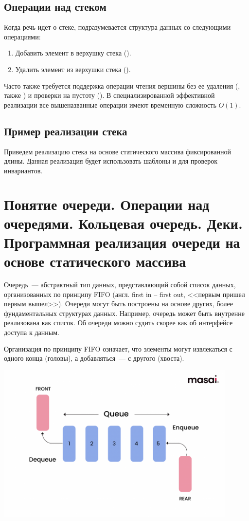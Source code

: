 \subsection{Операции над стеком}
Когда речь идет о стеке, подразумевается структура данных со следующими операциями:
\begin{enumerate}
  \item Добавить элемент в верхушку стека ().
  \item Удалить элемент из верхушки стека ().
\end{enumerate}

Часто также требуется поддержка операции чтения вершины без ее удаления (, также ) и
проверки на пустоту (). В специализированной эффективной реализации все вышеназванные операции имеют временную сложность
\(O(1)\).

\subsection{Пример реализации стека}
Приведем реализацию стека на основе статического массива фиксированной длины. Данная реализация будет использовать шаблоны и
 для проверок инвариантов.

\section{Понятие очереди. Операции над очередями. Кольцевая очередь. Деки.  Программная реализация очереди на основе статического массива}
Очередь~--- абстрактный тип данных, представляющий собой список данных, организованных по принципу FIFO (англ. first in -- first out, <<первым пришел первым вышел>>).
Очереди могут быть построены на основе других, более фундаментальных структурах данных. Например, очередь может быть внутренне реализована как
список. Об очереди можно судить скорее как об интерфейсе доступа к данным.

Организация по принципу FIFO означает, что элементы могут извлекаться с одного конца (головы), а добавляться~--- с другого (хвоста).

\includegraphics[width=0.9\textwidth]{resources/19-26/queue.png}


